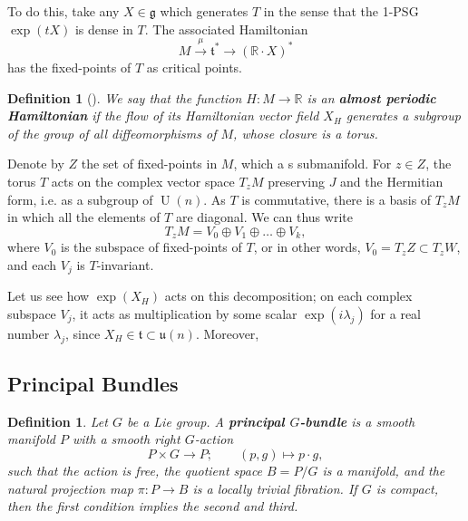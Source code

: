 \documentclass{article}
\newtheorem{defn}[theorem]{Definition\rm}
\newcommand{\ra}{\rightarrow}
\newcommand{\lra}{\longrightarrow}
\newcommand{\RR}{\mathbb{R}}
\newcommand{\mfg}{\mathfrak{g}}
\newcommand{\mft}{\mathfrak{t}}
\newcommand{\mf}[1]{\mathfrak{#1}}
\DeclareMathOperator{\UU}{U}
\begin{document}
	To do this, take any $X \in \mfg$ which generates $T$ in the sense that the 1-PSG $\exp(tX)$ is dense in $T$. The associated Hamiltonian
	\[
		M \overset{\mu}{\lra} \mft^{\ast} \lra (\RR \cdot X)^{\ast}
	\]
	has the fixed-points of $T$ as critical points.
	
	\begin{defn}[\cite{Audin1997}]
		We say that the function $H : M \ra \RR$ is an \textbf{almost periodic Hamiltonian} if the flow of its Hamiltonian vector field $X_{H}$ generates a subgroup of the group of all diffeomorphisms of $M$, whose closure is a torus.
	\end{defn}

	Denote by $Z$ the set of fixed-points in $M$, which a s submanifold. For $z \in Z$, the torus $T$ acts on the complex vector space $T_{z}M$ preserving $J$ and the Hermitian form, i.e. as a subgroup of $\UU(n)$. As $T$ is commutative, there is a basis of $T_{z}M$ in which all the elements of $T$ are diagonal. We can thus write
	\[
		T_{z}M = V_{0} \oplus V_{1} \oplus \ldots \oplus V_{k},
	\]
	where $V_{0}$ is the subspace of fixed-points of $T$, or in other words, $V_{0} = T_{z}Z \subset T_{z}W$, and each $V_{j}$ is $T$-invariant.
	
	Let us see how $\exp(X_{H})$ acts on this decomposition; on each complex subspace $V_{j}$, it acts as multiplication by some scalar $\exp(i\lambda_{j})$ for a real number $\lambda_{j}$, since $X_{H} \in \mft \subset \mf{u}(n)$. Moreover, 

	












	\subsection{Principal Bundles}
	
	\begin{defn}
		Let $G$ be a Lie group. A \textbf{principal $G$-bundle} is a smooth manifold $P$ with a smooth right $G$-action 
		\[
		P \times G \ra P; \qquad (p,g) \longmapsto p \cdot g,
		\]
		such that the action is free, the quotient space $B = P/G$ is a manifold, and the natural projection map $\pi : P \ra B$ is a locally trivial fibration. If $G$ is compact, then the first condition implies the second and third.
	\end{defn}
	
\end{document}
